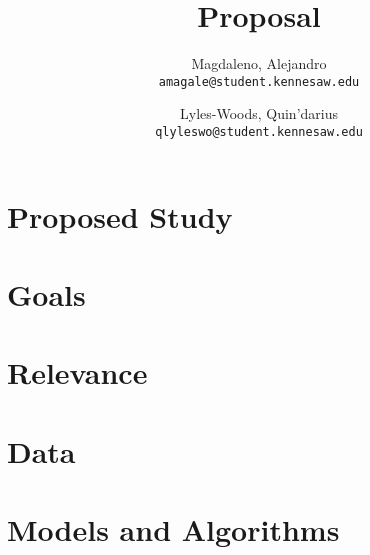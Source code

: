 \documentclass{report}
\title{Proposal}
\author{
	Magdaleno, Alejandro\\
	\texttt{amagale@student.kennesaw.edu}
	\and
	Lyles-Woods, Quin'darius \\
	\texttt{qlyleswo@student.kennesaw.edu}
}
\begin{document}
\maketitle
\section*{Proposed Study}

\section*{Goals}

\section*{Relevance}

\section*{Data}

\section*{Models and Algorithms}

\end{document}
